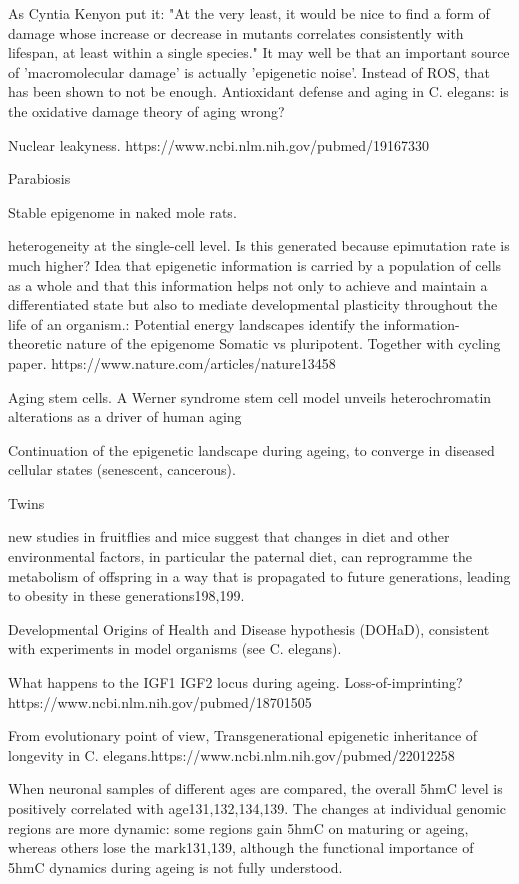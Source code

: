 As Cyntia Kenyon put it: "At the very least, it would be nice to find a form of damage whose increase or decrease in mutants correlates consistently with lifespan, at least within a single species." \cite{Kenyon2010}
It may well be that an important source of 'macromolecular damage' is actually 'epigenetic noise'. 
Instead of ROS, that has been shown to not be enough. 
Antioxidant defense and aging in C. elegans: is the oxidative damage theory of aging wrong?

Nuclear leakyness. 
https://www.ncbi.nlm.nih.gov/pubmed/19167330

Parabiosis

Stable epigenome in naked mole rats.

heterogeneity at the single-cell level. Is this generated because epimutation rate is much higher?
Idea that epigenetic information is carried by a population of cells as a whole and that this information helps not only to achieve and maintain a differentiated state but also to mediate developmental plasticity throughout the life of an organism.: Potential energy landscapes identify the information-theoretic nature of the epigenome
Somatic vs pluripotent. Together with cycling paper. 
https://www.nature.com/articles/nature13458

Aging stem cells. A Werner syndrome stem cell model unveils heterochromatin alterations as a driver of human aging

Continuation of the epigenetic landscape during ageing, to converge in diseased cellular states (senescent, cancerous).

Twins

new studies in fruitflies and mice suggest that changes in diet and other environmental factors, in particular the paternal diet, can reprogramme the metabolism of offspring in a way that is propagated to future generations, leading to obesity in these generations198,199. \cite{Allis2016}

Developmental Origins of Health and Disease hypothesis (DOHaD), consistent with experiments in model organisms (see C. elegans).

What happens to the IGF1 IGF2 locus during ageing. Loss-of-imprinting?
https://www.ncbi.nlm.nih.gov/pubmed/18701505

 From evolutionary point of view, Transgenerational epigenetic inheritance of longevity in C. elegans.https://www.ncbi.nlm.nih.gov/pubmed/22012258

When neuronal samples of different ages are compared, the overall 5hmC level is positively correlated with age131,132,134,139. The changes at individual genomic regions are more dynamic: some regions gain 5hmC on maturing or ageing, whereas others lose the mark131,139, although the functional importance of 5hmC dynamics during ageing is not fully understood. \cite{Wu2017}


